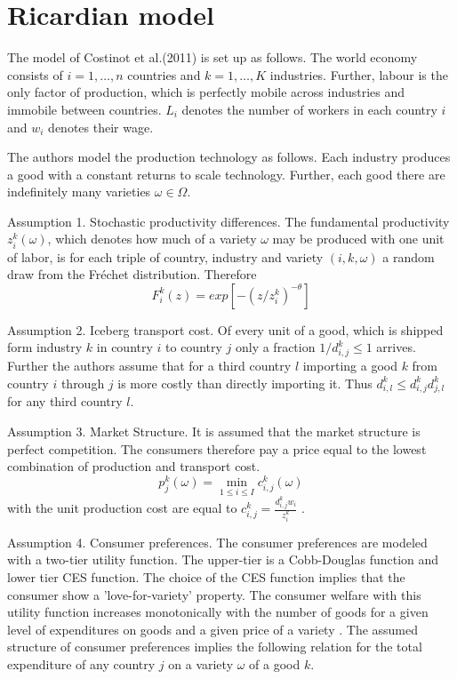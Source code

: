 \section{Ricardian model}
\label{sec:Ricardo}
The model of Costinot et al.(2011) is set up as follows. The world economy consists of  $i = 1, \dots, n$ countries and $k = 1, \dots , K $ industries. Further, labour is the only factor of production, which is perfectly mobile across industries and immobile between countries. $L_i $ denotes the number of workers in each country $i$  and $ w_i $ denotes their wage. \par %
The authors model the production technology as follows.  Each industry produces a good with a constant returns to scale technology. Further, each good there are indefinitely many varieties $\omega \in \Omega$. \par
Assumption 1. Stochastic productivity differences. The fundamental productivity $z_i^k(\omega)$, which denotes how much of a variety $\omega$ may be produced with one unit of labor,  is for each triple of country, industry and variety $(i,k,\omega)$ a random draw from the Fr{\'e}chet distribution. Therefore \[ F^k_i (z) = exp [-(z/z^{k}_i )^{-\theta} ] \] \par
Assumption 2. Iceberg transport cost. Of every unit of a good, which is shipped form industry $k$ in country $i$ to country $j$ only a fraction $1/d^k_{i,j} \leq 1$ arrives. Further the authors assume that for a third country $l$ importing a good $k$ from country $i$ through $j$ is more costly than directly importing it. Thus $d^k_{i,l} \leq d^k_{i,j} d^k_{j,l} $ for any third country $l$. \par
Assumption 3. Market Structure. It is assumed that the market structure is perfect competition. The consumers therefore pay a price equal to the lowest combination of production and transport cost. \[p^k_j(\omega)=\min_{1\leq i \leq I} {c_{i,j}^k(\omega)} \] with the unit production cost are equal to $c^k_{i,j}=\frac{d^k_{i,j} w_i}{z_i^k}$ . \par
Assumption 4. Consumer preferences. The consumer preferences are modeled with a  two-tier utility function. The upper-tier is a Cobb-Douglas function and lower tier CES function. 
The choice of the CES function implies that the consumer show a 'love-for-variety' property. The consumer welfare with this utility function increases monotonically with the number of goods  for a given level of expenditures on goods and a given price of a variety   \textcite[p. 118]{helpman}. The assumed structure of consumer preferences implies the following relation for the total expenditure of any country $j$ on a variety $\omega$ of a good $k$. 
